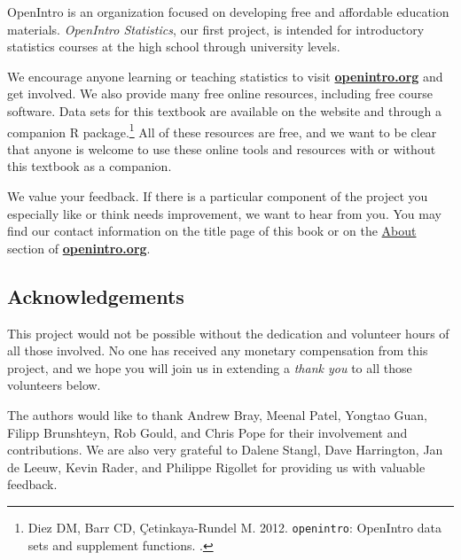 OpenIntro is an organization focused on developing free and affordable education materials. \emph{OpenIntro Statistics}, our first project, is intended for introductory statistics courses at the high school through university levels.

We encourage anyone learning or teaching statistics to visit \href{http://www.openintro.org}{\color{black}\textbf{openintro.org}} and get involved. We also provide many free online resources, including free course software. Data sets for this textbook are available on the website and through a companion R package.\footnote{Diez DM, Barr CD, \c{C}etinkaya-Rundel M. 2012. \texttt{openintro}: OpenIntro data sets and supplement functions. .} All of these resources are free, and we want to be clear that anyone is welcome to use these online tools and resources with or without this textbook as a companion.

We value your feedback. If there is a particular component of the project you especially like or think needs improvement, we want to hear from you. You may find our contact information on the title page of this book or on the \href{http://www.openintro.org/about.php}{About} section of \href{http://www.openintro.org}{\color{black}\textbf{openintro.org}}.

\subsection*{Acknowledgements}

This project would not be possible without the dedication and volunteer hours of all those involved. No one has received any monetary compensation from this project, and we hope you will join us in extending a \emph{thank you} to all those volunteers below.

The authors would like to thank Andrew Bray, Meenal Patel, Yongtao Guan, Filipp Brunshteyn, Rob Gould, and Chris Pope for their involvement and contributions. We are also very grateful to Dalene Stangl, Dave Harrington, Jan de Leeuw, Kevin Rader, and Philippe Rigollet for providing us with valuable feedback.


